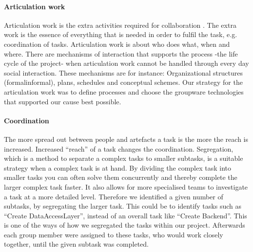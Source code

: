 \paragraph{Articulation work} \label{par:articulationwork}
Articulation work is the extra activities required for collaboration \cite{schmidt1992taking}. The extra work is the essence of everything that is needed in order to fulfil the task, e.g. coordination of tasks. Articulation work is about who does what, when and where. There are mechanisms of interaction that supports the process -the life cycle of the project- when articulation work cannot be handled through every day social interaction. These mechanisms are for instance: Organizational structures (formal\/informal), plans, schedules and conceptual schemes. 
Our strategy for the articulation work was to define processes and choose the groupware technologies that supported our cause best possible.

\paragraph{Coordination} \label{par:coordination}
The more spread out between people and artefacts a task is the more the reach is increased. Increased ``reach'' of a task changes the coordination. Segregation, which is a method to separate a complex tasks to smaller subtasks, is a suitable strategy when a complex task is at hand. By dividing the complex task into smaller tasks you can often solve them concurrently and thereby complete the larger complex task faster. It also allows for more specialised teams to investigate a task at a more detailed level. Therefore we identified a given number of subtasks, by segregating the larger task. This could be to identify tasks such as ``Create DataAccessLayer'', instead of an overall task like ``Create Backend''. This is one of the ways of how we segregated the tasks within our project. Afterwards each group member were assigned to these tasks, who would work closely together, until the given subtask was completed.


